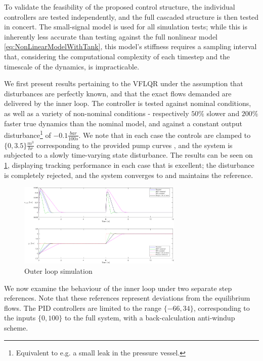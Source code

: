 To validate the feasibility of the proposed control structure, the individual controllers are tested independently, and the full cascaded structure is then tested in concert. The small-signal model is used for all simulation tests; while this is inherently less accurate than testing against the full nonlinear model \cref{eq:NonLinearModelWithTank}, this model's stiffness requires a sampling interval that, considering the computational complexity of each timestep and the timescale of the dynamics, is impracticable.

We first present results pertaining to the VFLQR under the assumption that disturbances are perfectly known, and that the exact flows demanded are delivered by the inner loop. The controller is tested against nominal conditions, as well as a variety of non-nominal conditions - respectively $50\%$ slower and $200\%$ faster true dynamics than the nominal model, and against a constant output disturbance\footnote{Equivalent to e.g. a small leak in the pressure vessel.} of $-0.1 \frac{\si{bar}}{100\si{s}}$. We note that in each case the controls are clamped to $\{0, 3.5\} \frac{\si{m^3}}{\si{hr}}$ corresponding to the provided pump curves \cite{GrundfosDatablad}, and the system is subjected to a slowly time-varying state disturbance. The results can be seen on \cref{fig:LQRTracking}, displaying tracking performance in each case that is excellent; the disturbance is completely rejected, and the system converges to and maintains the reference. 


\begin{figure}[h!]
	\includegraphics[height=4cm, width=\linewidth]{Graphics/LQRTracking.pdf}
	\caption{Outer loop simulation}
	\label{fig:LQRTracking}
\end{figure}

 We now examine the behaviour of the inner loop under two separate step references. Note that these references represent deviations from the equilibrium flows. The PID controllers are limited to the range $\{-66,34\}$, corresponding to the inputs $\{0,100\}$ to the full system, with a back-calculation anti-windup scheme.

